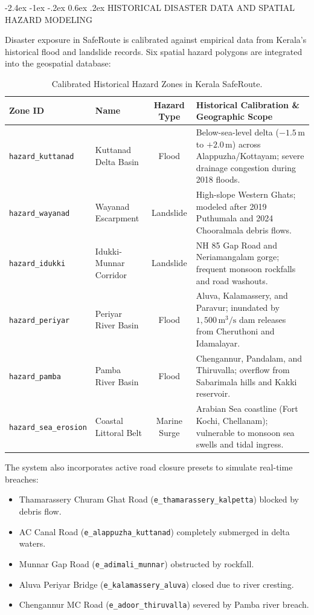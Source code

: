 \documentclass[12pt,oneside]{report}
\makeatletter
\renewcommand{\section}{\@startsection{section}{1}{\z@}%
  {-2.4ex \@plus -1ex \@minus -.2ex}%
  {0.6ex \@plus .2ex}%
  {\normalfont\large\bfseries}}
\makeatother
\begin{document}
\section{HISTORICAL DISASTER DATA AND SPATIAL HAZARD MODELING}

Disaster exposure in SafeRoute is calibrated against empirical data from Kerala's historical flood and landslide records. Six spatial hazard polygons are integrated into the geospatial database:

\begin{table}[H]
\centering
\small
\caption{Calibrated Historical Hazard Zones in Kerala SafeRoute.}
\label{tab:hazard_zones}
\vspace{0.05in}
\begin{tabularx}{\textwidth}{lp{2.5cm}cp{5.8cm}}
\toprule
\textbf{Zone ID} & \textbf{Name} & \textbf{Hazard Type} & \textbf{Historical Calibration \& Geographic Scope} \\
\midrule
\texttt{hazard\_kuttanad} & Kuttanad Delta Basin & Flood & Below-sea-level delta ($-1.5$\,m to $+2.0$\,m) across Alappuzha/Kottayam; severe drainage congestion during 2018 floods. \\
\texttt{hazard\_wayanad} & Wayanad Escarpment & Landslide & High-slope Western Ghats; modeled after 2019 Puthumala and 2024 Chooralmala debris flows. \\
\texttt{hazard\_idukki} & Idukki-Munnar Corridor & Landslide & NH 85 Gap Road and Neriamangalam gorge; frequent monsoon rockfalls and road washouts. \\
\texttt{hazard\_periyar} & Periyar River Basin & Flood & Aluva, Kalamassery, and Paravur; inundated by $1,500\,\text{m}^3/\text{s}$ dam releases from Cheruthoni and Idamalayar. \\
\texttt{hazard\_pamba} & Pamba River Basin & Flood & Chengannur, Pandalam, and Thiruvalla; overflow from Sabarimala hills and Kakki reservoir. \\
\texttt{hazard\_sea\_erosion} & Coastal Littoral Belt & Marine Surge & Arabian Sea coastline (Fort Kochi, Chellanam); vulnerable to monsoon sea swells and tidal ingress. \\
\bottomrule
\end{tabularx}
\end{table}

The system also incorporates active road closure presets to simulate real-time breaches:
\begin{itemize}
    \item Thamarassery Churam Ghat Road (\texttt{e\_thamarassery\_kalpetta}) blocked by debris flow.
    \item AC Canal Road (\texttt{e\_alappuzha\_kuttanad}) completely submerged in delta waters.
    \item Munnar Gap Road (\texttt{e\_adimali\_munnar}) obstructed by rockfall.
    \item Aluva Periyar Bridge (\texttt{e\_kalamassery\_aluva}) closed due to river cresting.
    \item Chengannur MC Road (\texttt{e\_adoor\_thiruvalla}) severed by Pamba river breach.
\end{itemize}
\end{document}
